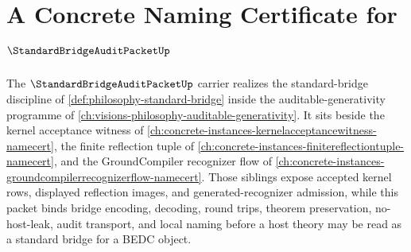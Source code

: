 \chapter{A Concrete Naming Certificate for $\StandardBridgeAuditPacketUp$}
\label{ch:concrete-instances-standardbridgeauditpacket-namecert}

The $\StandardBridgeAuditPacketUp$ carrier realizes the standard-bridge discipline of \autoref{def:philosophy-standard-bridge} inside the auditable-generativity programme of \autoref{ch:visions-philosophy-auditable-generativity}. It sits beside the kernel acceptance witness of \autoref{ch:concrete-instances-kernelacceptancewitness-namecert}, the finite reflection tuple of \autoref{ch:concrete-instances-finitereflectiontuple-namecert}, and the GroundCompiler recognizer flow of \autoref{ch:concrete-instances-groundcompilerrecognizerflow-namecert}. Those siblings expose accepted kernel rows, displayed reflection images, and generated-recognizer admission, while this packet binds bridge encoding, decoding, round trips, theorem preservation, no-host-leak, audit transport, and local naming before a host theory may be read as a standard bridge for a BEDC object.

